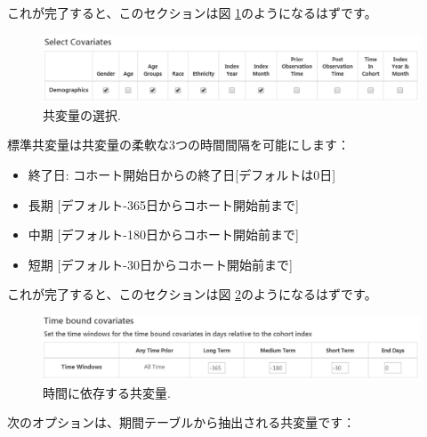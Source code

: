 \documentclass[
  11pt]{book}
\providecommand{\tightlist}{%
  \setlength{\itemsep}{0pt}\setlength{\parskip}{0pt}}
\theoremstyle{definition}
\theoremstyle{definition}
\theoremstyle{definition}
\theoremstyle{definition}
\theoremstyle{remark}
\begin{document}
これが完了すると、このセクションは図 \ref{fig:covariateSettings2}のようになるはずです。

\begin{figure}

{\centering \includegraphics[width=1\linewidth]{images/PatientLevelPrediction/covariateSettings2} 

}

\caption{共変量の選択.}\label{fig:covariateSettings2}
\end{figure}

標準共変量は共変量の柔軟な3つの時間間隔を可能にします：

\begin{itemize}
\tightlist
\item
  終了日: コホート開始日からの終了日{[}デフォルトは0日{]}
\item
  長期 {[}デフォルト-365日からコホート開始前まで{]}
\item
  中期 {[}デフォルト-180日からコホート開始前まで{]}
\item
  短期 {[}デフォルト-30日からコホート開始前まで{]}
\end{itemize}

これが完了すると、このセクションは図 \ref{fig:covariateSettings3}のようになるはずです。

\begin{figure}

{\centering \includegraphics[width=1\linewidth]{images/PatientLevelPrediction/covariateSettings3} 

}

\caption{時間に依存する共変量.}\label{fig:covariateSettings3}
\end{figure}

次のオプションは、期間テーブルから抽出される共変量です：
\end{document}
